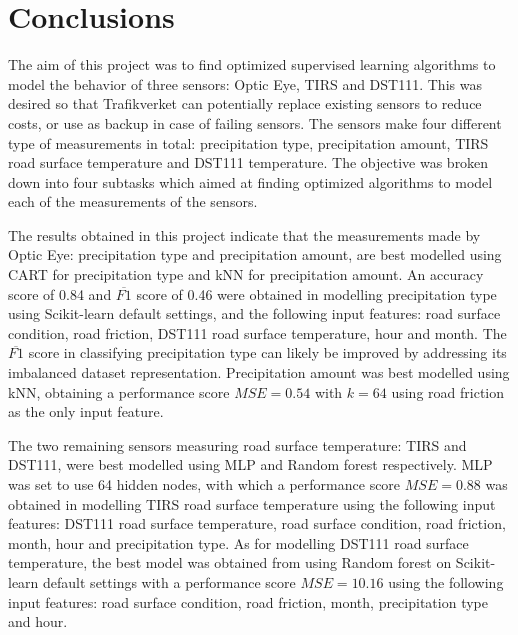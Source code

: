 
\section{Conclusions}
	The aim of this project was to find optimized supervised learning algorithms to model the behavior of three sensors: Optic Eye, TIRS and DST111. This was desired so that Trafikverket can potentially replace existing sensors to reduce costs, or use as backup in case of failing sensors. The sensors make four different type of measurements in total: precipitation type, precipitation amount, TIRS road surface temperature and DST111 temperature. The objective was broken down into four subtasks which aimed at finding optimized algorithms to model each of the measurements of the sensors.

	The results obtained in this project indicate that the measurements made by Optic Eye: precipitation type and precipitation amount, are best modelled using CART for precipitation type and kNN for precipitation amount. An accuracy score of 0.84 and $\overline{F1}$ score of 0.46 were obtained in modelling precipitation type using Scikit-learn default settings, and the following input features: road surface condition, road friction, DST111 road surface temperature, hour and month. 	The $\overline{F1}$ score in classifying precipitation type can likely be improved by addressing its imbalanced dataset representation. Precipitation amount was best modelled using kNN, obtaining a performance score $MSE=0.54$ with $k=64$ using road friction as the only input feature. 

	The two remaining sensors measuring road surface temperature: TIRS and DST111, were best modelled using MLP and Random forest respectively. MLP was set to use 64 hidden nodes, with which a performance score $MSE=0.88$ was obtained in modelling TIRS road surface temperature using the following input features: DST111 road surface temperature, road surface condition, road friction, month, hour and precipitation type. As for modelling DST111 road surface temperature, the best model was obtained from using Random forest on Scikit-learn default settings with a performance score $MSE=10.16$ using the following input features: road surface condition, road friction, month, precipitation type and hour.

